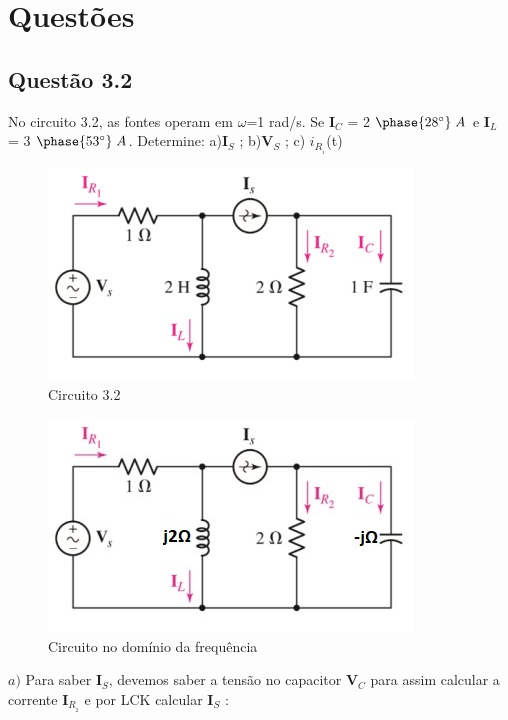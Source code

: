 \documentclass[
	12pt,				%
	oneside,			%
	a4paper,			%
	english,			%
	french,				%
	spanish,			%
	brazil				%
	]{abntex2}
\begin{document}
\chapter{Questões}


\section*{Questão 3.2}
No circuito 3.2, as fontes operam em $\omega$=1 rad/s. Se \textbf{I$_C$} = 2$\;\phase{28^{\circ}}\;A$ e \textbf{I$_L$} = 3$\;\phase{53^{\circ}}\;A$. Determine: a)\textbf{I$_S$} ; b)\textbf{V$_S$} ; c) $i_R__1$(t)
\begin{figure}[htb]
	\centering
	\includegraphics[scale=0.65]{3-02.jpeg}
	\caption{Circuito 3.2}
\end{figure}
\begin{figure}[htb]
	\centering
	\includegraphics[scale=1]{3-02-2.jpeg}
	\caption{Circuito no domínio da frequência}
\end{figure}
\newline
$a)$ Para saber \textbf{I$_S$}, devemos saber a tensão no capacitor \textbf{V$_C$} para assim calcular a corrente \textbf{I$_R__2$} e por LCK calcular \textbf{I$_S$} :
\end{document}

